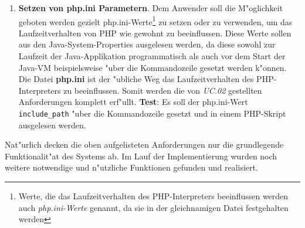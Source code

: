 \begin{enumerate}
\item \textbf{Setzen von php.ini Parametern}. Dem Anwender soll die M"oglichkeit geboten werden gezielt php.ini-Werte\footnote{Werte, die das Laufzeitverhalten
des PHP-Interpreters beeinflussen werden auch \emph{php.ini-Werte} genannt, da sie in der gleichnamigen Datei festgehalten werden}   
    zu setzen oder zu verwenden,
    um das Laufzeitverhalten von PHP wie gewohnt zu beeinflussen. Diese Werte sollen aus den Java-System-Properties ausgelesen werden,
    da diese sowohl zur Laufzeit der Java-Applikation programmatisch als auch vor dem Start der Java-VM beispielsweise "uber die Kommandozeile
    gesetzt werden k"onnen. Die Datei \textbf{php.ini} ist der "ubliche Weg das Laufzeitverhalten des PHP-Interpreters zu beeinflussen. Somit werden
    die von \emph{UC.02} gestellten Anforderungen komplett erf"ullt.
    \textbf{Test}: Es soll der php.ini-Wert \texttt{include\_path} "uber die Kommandozeile gesetzt und in einem PHP-Skript ausgelesen werden. 

\end{enumerate}

Nat"urlich decken die oben aufgelisteten Anforderungen nur die grundlegende Funktionalit"at des Systems ab. Im Lauf der Implementierung wurden
noch weitere notwendige und n"utzliche Funktionen gefunden und realisiert.
